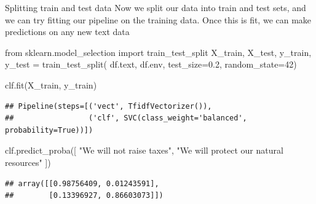 \documentclass[
  10pt,
  ignorenonframetext,
  aspectratio=169]{beamer}
\newenvironment{Shaded}{\begin{snugshade}}{\end{snugshade}}
\newcommand{\DecValTok}[1]{\textcolor[rgb]{0.86,0.86,0.80}{#1}}
\newcommand{\FloatTok}[1]{\textcolor[rgb]{0.75,0.75,0.82}{#1}}
\newcommand{\ImportTok}[1]{\textcolor[rgb]{0.80,0.80,0.80}{#1}}
\newcommand{\NormalTok}[1]{\textcolor[rgb]{0.80,0.80,0.80}{#1}}
\newcommand{\OperatorTok}[1]{\textcolor[rgb]{0.94,0.94,0.82}{#1}}
\newcommand{\StringTok}[1]{\textcolor[rgb]{0.80,0.58,0.58}{#1}}
\begin{document}
\begin{frame}[fragile]{Splitting train and test data}
\protect\hypertarget{splitting-train-and-test-data}{}
Now we split our data into train and test sets, and we can try fitting
our pipeline on the training data. Once this is fit, we can make
predictions on any new text data

\medskip
\scriptsize

\begin{Shaded}
\begin{Highlighting}[]
\ImportTok{from}\NormalTok{ sklearn.model\_selection }\ImportTok{import}\NormalTok{ train\_test\_split}
\NormalTok{X\_train, X\_test, y\_train, y\_test }\OperatorTok{=}\NormalTok{ train\_test\_split(}
\NormalTok{    df.text, df.env, test\_size}\OperatorTok{=}\FloatTok{0.2}\NormalTok{, random\_state}\OperatorTok{=}\DecValTok{42}\NormalTok{)}

\NormalTok{clf.fit(X\_train, y\_train)}
\end{Highlighting}
\end{Shaded}

\begin{verbatim}
## Pipeline(steps=[('vect', TfidfVectorizer()),
##                 ('clf', SVC(class_weight='balanced', probability=True))])
\end{verbatim}

\begin{Shaded}
\begin{Highlighting}[]
\NormalTok{clf.predict\_proba([}
    \StringTok{"We will not raise taxes"}\NormalTok{,}
    \StringTok{"We will protect our natural resources"}
\NormalTok{])}
\end{Highlighting}
\end{Shaded}

\begin{verbatim}
## array([[0.98756409, 0.01243591],
##        [0.13396927, 0.86603073]])
\end{verbatim}
\end{frame}
\end{document}
